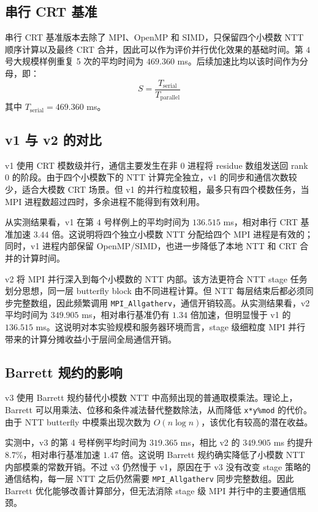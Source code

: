 \documentclass[a4paper]{article}
\begin{document}
\subsection{串行 CRT 基准}

串行 CRT 基准版本去除了 MPI、OpenMP 和 SIMD，只保留四个小模数 NTT 顺序计算以及最终 CRT 合并，因此可以作为评价并行优化效果的基础时间。第 $4$ 号大规模样例重复 5 次的平均时间为 $469.360$ ms。后续加速比均以该时间作为分母，即：
\[
S=\frac{T_{\mathrm{serial}}}{T_{\mathrm{parallel}}}
\]
其中 $T_{\mathrm{serial}}=469.360$ ms。

\subsection{v1 与 v2 的对比}

v1 使用 CRT 模数级并行，通信主要发生在非 0 进程将 residue 数组发送回 rank 0 的阶段。由于四个小模数下的 NTT 计算完全独立，v1 的同步和通信次数较少，适合大模数 CRT 场景。但 v1 的并行粒度较粗，最多只有四个模数任务，当 MPI 进程数超过四时，多余进程不能得到有效利用。

从实测结果看，v1 在第 $4$ 号样例上的平均时间为 $136.515$ ms，相对串行 CRT 基准加速 $3.44$ 倍。这说明将四个独立小模数 NTT 分配给四个 MPI 进程是有效的；同时，v1 进程内部保留 OpenMP/SIMD，也进一步降低了本地 NTT 和 CRT 合并的计算时间。

v2 将 MPI 并行深入到每个小模数的 NTT 内部。该方法更符合 NTT stage 任务划分思想，同一层 butterfly block 由不同进程计算。但 NTT 每层结束后都必须同步完整数组，因此频繁调用 \texttt{MPI\_Allgatherv}，通信开销较高。从实测结果看，v2 平均时间为 $349.905$ ms，相对串行基准仍有 $1.34$ 倍加速，但明显慢于 v1 的 $136.515$ ms。这说明对本实验规模和服务器环境而言，stage 级细粒度 MPI 并行带来的计算分摊收益小于层间全局通信开销。

\subsection{Barrett 规约的影响}

v3 使用 Barrett 规约替代小模数 NTT 中高频出现的普通取模乘法。理论上，Barrett 可以用乘法、位移和条件减法替代整数除法，从而降低 \texttt{x*y\%mod} 的代价。由于 NTT butterfly 中模乘出现次数为 $O(n\log n)$，该优化有较高的潜在收益。

实测中，v3 的第 4 号样例平均时间为 $319.365$ ms，相比 v2 的 $349.905$ ms 约提升 $8.7\%$，相对串行基准加速 $1.47$ 倍。这说明 Barrett 规约确实降低了小模数 NTT 内部模乘的常数开销。不过 v3 仍然慢于 v1，原因在于 v3 没有改变 stage 策略的通信结构，每一层 NTT 之后仍然需要 \texttt{MPI\_Allgatherv} 同步完整数组。因此 Barrett 优化能够改善计算部分，但无法消除 stage 级 MPI 并行中的主要通信瓶颈。
\end{document}
